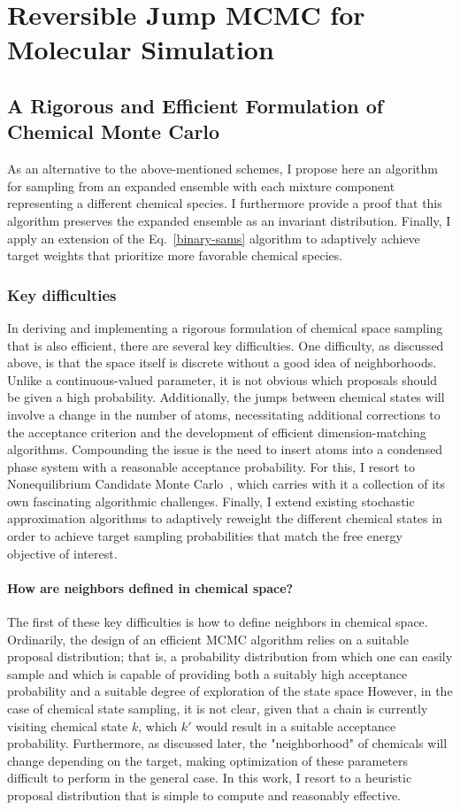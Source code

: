 \chapter{Reversible Jump MCMC for Molecular Simulation}

\section{A Rigorous and Efficient Formulation of Chemical Monte Carlo}
As an alternative to the above-mentioned schemes, I propose here an algorithm for sampling from an expanded ensemble with each mixture component representing a different chemical species.
%
I furthermore provide a proof that this algorithm preserves the expanded ensemble as an invariant distribution.
%
Finally, I apply an extension of the Eq.~\ref{binary-sams} algorithm to adaptively achieve target weights that prioritize more favorable chemical species.
%
\subsection{Key difficulties}
%
In deriving and implementing a rigorous formulation of chemical space sampling that is also efficient, there are several key difficulties.
%
One difficulty, as discussed above, is that the space itself is discrete without a good idea of neighborhoods.
%
Unlike a continuous-valued parameter, it is not obvious which proposals should be given a high probability.
%
Additionally, the jumps between chemical states will involve a change in the number of atoms, necessitating additional corrections to the acceptance criterion and the development of efficient dimension-matching algorithms.
%
Compounding the issue is the need to insert atoms into a condensed phase system with a reasonable acceptance probability. 
%
For this, I resort to Nonequilibrium Candidate Monte Carlo~\cite{Nilmeier2011}, which carries with it a collection of its own fascinating algorithmic challenges.
%
Finally, I extend existing stochastic approximation algorithms to adaptively reweight the different chemical states in order to achieve target sampling probabilities that match the free energy objective of interest.
%
\subsubsection{How are neighbors defined in chemical space?}
%
The first of these key difficulties is how to define neighbors in chemical space.
%
Ordinarily, the design of an efficient MCMC algorithm relies on a suitable proposal distribution\cite{Liu2004}; that is, a probability distribution from which one can easily sample and which is capable of providing both a suitably high acceptance probability and a suitable degree of exploration of the state space
%
However, in the case of chemical state sampling, it is not clear, given that a chain is currently visiting chemical state $k$, which $k'$ would result in a suitable acceptance probability.
%
Furthermore, as discussed later, the "neighborhood" of chemicals will change depending on the target, making optimization of these parameters difficult to perform in the general case.
%
In this work, I resort to a heuristic proposal distribution that is simple to compute and reasonably effective.
%
